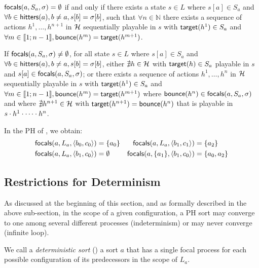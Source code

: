 \begin{property}
\label{pro:no-focals}
$\mathsf{focals}(a,S_a,\sigma)=\emptyset$ if and only if
there exists a 
state $s\in L$
where
$s[a]\in S_a$ and
$\forall b\in \mathsf{hitters}(a), b\neq a, s[b] = \sigma[b]$,
such that
$\forall n\in \mathbb N$
there 
exists a sequence of actions $h^1,\dots,h^{n+1}$ in $\mathcal{H}$
sequentially playable in $s$ with
$\mathsf{target}(h^1)\in S_a$ and
$\forall m\in\llbracket 1 ; n-1 \rrbracket, \mathsf{bounce}(h^m)=\mathsf{target}(h^{m+1})$.
\end{property}

\begin{property}
\label{pro:has-focals}
If $\mathsf{focals}(a,S_a,\sigma)\neq\emptyset$, for all
state $s\in L$
where
$s[a]\in S_a$ and
$\forall b\in \mathsf{hitters}(a), b\neq a, s[b] = \sigma[b]$,
either
$\nexists h\in\mathcal{H}$ with $\mathsf{target}(h)\in S_a$  playable in $s$ and
$s[a]\in\mathsf{focals}(a,S_a,\sigma)$;
or
there exists a sequence of actions $h^1,\dots,h^n$ in $\mathcal{H}$ sequentially playable in $s$ with
$\mathsf{target}(h^1)\in S_a$ and
$\forall m\in\llbracket 1 ; n-1 \rrbracket, \mathsf{bounce}(h^m)=\mathsf{target}(h^{m+1})$
where
 $\mathsf{bounce}(h^n) \in \mathsf{focals}(a,S_a,\sigma)$
 and
 where 
$\nexists h^{n+1}\in \mathcal{H}$ with $\mathsf{target}(h^{n+1})=\mathsf{bounce}(h^n)$ 
that is playable in $s\cdot h^1\cdot \cdots \cdot h^n$.
\end{property}



\begin{example}
In the PH of , we obtain:
\begin{align*}
\mathsf{focals}(a,L_a,\langle b_0,c_0 \rangle) &= \{ a_0 \}
&
\mathsf{focals}(a,L_a,\langle b_1,c_1 \rangle) &= \{ a_2 \}
\\
\mathsf{focals}(a,L_a,\langle b_1,c_0 \rangle) &= \emptyset
&
\mathsf{focals}(a,\{a_1\},\langle b_1,c_0 \rangle) &= \{ a_0, a_2 \}
\end{align*}
\end{example}

\subsection{Restrictions for Determinism} %
\label{ssec:dfocals}

As discussed at the beginning of this section, and as formally described in the above sub-section, 
in the scope of a given configuration,
a PH sort may converge to one among several different processes (indeterminism) or may never converge
(infinite loop).

We call a \emph{deterministic sort} () a sort $a$
that has a single focal process for each possible configuration of its predecessors in the scope of
$L_a$.

